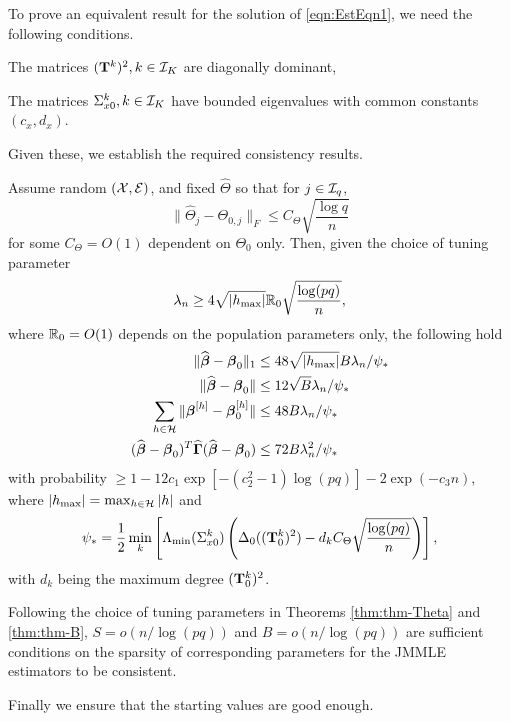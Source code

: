 To prove an equivalent result for the solution of \eqref{eqn:EstEqn1}, we need the following conditions.

\vspace{1em}
 The matrices $({\mathbf{T}}^k)^2, k \in {\cal{I}}_K$ are diagonally dominant,

 The matrices $\Sigma_{x0}^k, k \in {\cal{I}}_K$ have bounded eigenvalues with common constants $(c_x, d_x)$.
\vspace{1em}
%

\noindent Given these, we establish the required consistency results.

\begin{Theorem}\label{thm:thm-B}
Assume random $({\cal{X}}, {\cal{E}})$, and fixed $\widehat \Theta$ so that for $j \in {\cal{I}}_q$,
%
\[
\| \widehat \Theta_j - \Theta_{0,j} \|_F \leq C_\Theta \sqrt{\frac{\log q}{n}}
\]
%
for some $C_\Theta = O(1)$ dependent on $\Theta_0$ only. Then, given the choice of tuning parameter
%
$$
\lambda_n \geq 4 \sqrt{| h_{\max} |} {\mathbb{R}}_0 \sqrt{ \frac{ \log(pq)}{n}},
$$
%
where ${\mathbb{R}}_0 = O(1)$ depends on the population parameters only, the following hold
%
\begin{align}
\| \widehat {{\boldsymbol{\beta}}} - {\boldsymbol{\beta}}_0 \|_1 & \leq 48 \sqrt{ | h_{\max} |} B \lambda_n / \psi_* \label{eqn:BetaThmEqn1}\\
\| \widehat {{\boldsymbol{\beta}}} - {\boldsymbol{\beta}}_0 \| & \leq 12 \sqrt B \lambda_n / \psi_* \label{eqn:BetaThmEqn2}\\
\sum_{h \in {\cal{H}}} \| {\boldsymbol{\beta}}^{[h]} - {\boldsymbol{\beta}}_0^{[h]} \| & \leq 48 B \lambda_n / \psi_* \label{eqn:BetaThmEqn3}\\
(\widehat {{\boldsymbol{\beta}}} - {\boldsymbol{\beta}}_0 )^T \widehat {{\boldsymbol{\Gamma}}} (\widehat {{\boldsymbol{\beta}}} - {\boldsymbol{\beta}}_0 ) & \leq
72 B \lambda_n^2 / \psi_* \label{eqn:BetaThmEqn4}
\end{align}
%
with probability $\geq 1 - 12 c_1 \exp[-(c_2^2-1) \log(pq)] - 2 \exp( -c_3 n)$, where $|h_{\max}| = \max_{h \in {\cal{H}}} |h|$ and
%
$$
\psi_*= \frac{1}{2} \min_k \left[ \Lambda_{\min} (\Sigma_{x 0}^k) \left( \Delta_0 ( ({\mathbf{T}}_0^k)^2)
- d_k C_\Theta \sqrt{ \frac{\log (pq)}{n}} \right) \right],
$$
%
with $d_k$ being the maximum degree $({\mathbf{T}}_0^k)^2$.
\end{Theorem}

Following the choice of tuning parameters in Theorems \ref{thm:thm-Theta} and \ref{thm:thm-B}, $S = o(n/\log (pq))$ and $B = o(n/\log (pq))$ are sufficient conditions on the sparsity of corresponding parameters for the JMMLE estimators to be consistent.

Finally we ensure that the starting values are good enough.

